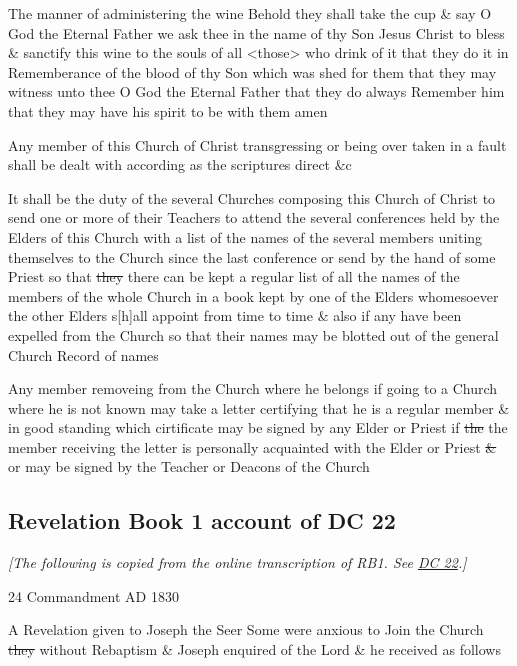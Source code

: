 		The manner of administering the wine Behold they shall take the cup \& say O God the Eternal Father we ask thee in the name of thy Son Jesus Christ to bless \& sanctify this wine to the souls of all <those> who drink of it that they do it in Rememberance of the blood of thy Son which was shed for them that they may witness unto thee O God the Eternal Father that they do always Remember him that they may have his spirit to be with them amen

		Any member of this Church of Christ transgressing or being over taken in a fault shall be dealt with according as the scriptures direct \&c
		
		It shall be the duty of the several Churches composing this Church of Christ to send one or more of their Teachers to attend the several conferences held by the Elders of this Church with a list of the names of the several members uniting themselves to the Church since the last conference or send by the hand of some Priest so that \sout{they} there can be kept a regular list of all the names of the members of the whole Church in a book kept by one of the Elders whomesoever the other Elders s[h]all appoint from time to time \& also if any have been expelled from the Church so that their names may be blotted out of the general Church Record of names

		Any member removeing from the Church where he belongs if going to a Church where he is not known may take a letter certifying that he is a regular member \& in good standing which cirtificate may be signed by any Elder or Priest if \sout{the} the member receiving the letter is personally acquainted with the Elder or Priest \sout{\&} or may be signed by the Teacher or Deacons of the Church
		
	\subsection{Revelation Book 1 account of DC 22}
		\label{EXSS-DC22-RB1}
		
		\textit{[The following is copied from the online transcription of RB1. See \hyperref[DC22]{DC 22}.]}
		
		24 Commandment AD 1830
		
		A Revelation given to Joseph the Seer Some were anxious to Join the Church \sout{they} without Rebaptism \& Joseph enquired of the Lord \& he received as follows
		
